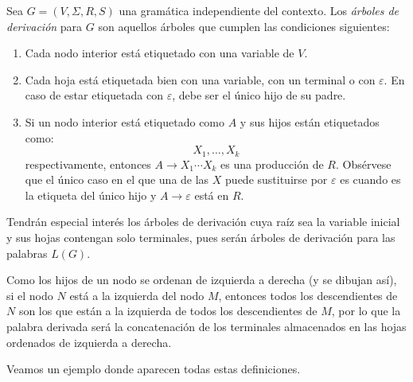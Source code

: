 \documentclass[twoside]{article}
\begin{document}
\begin{defi}
Sea $G=(V,\Sigma, R,S)$ una gramática independiente del contexto. Los \emph{árboles de derivación} para $G$ son aquellos árboles que cumplen las condiciones siguientes:
\begin{enumerate}
\item Cada nodo interior está etiquetado con una variable de $V$.
\item Cada hoja está etiquetada bien con una variable, con un terminal o con $\varepsilon$. En caso de estar etiquetada con $\varepsilon$, debe ser el único hijo de su padre. %
\item Si un nodo interior está etiquetado como $A$ y sus hijos están etiquetados como:
$$X_1,\dots, X_k$$
respectivamente, entonces $A\to X_1\cdots X_k$ es una producción de $R$. Obsérvese que el único caso en el que una de las $X$ puede sustituirse por $\varepsilon$ es cuando es la etiqueta del único hijo y $A\to\varepsilon$ está en $R$.
\end{enumerate}
Tendrán especial interés los árboles de derivación cuya raíz sea la variable inicial y sus hojas contengan solo terminales, pues serán árboles de derivación para las palabras $L(G)$. 

Como los hijos de un nodo se ordenan de izquierda a derecha (y se dibujan así), si el nodo $N$ está a la
izquierda del nodo $M$, entonces todos los descendientes de $N$ son los que están a la izquierda de todos los descendientes de $M$, por lo que la palabra derivada será la concatenación de los terminales almacenados en las hojas ordenados de izquierda a derecha.
\end{defi}

Veamos un ejemplo donde aparecen todas estas definiciones.
\end{document}
